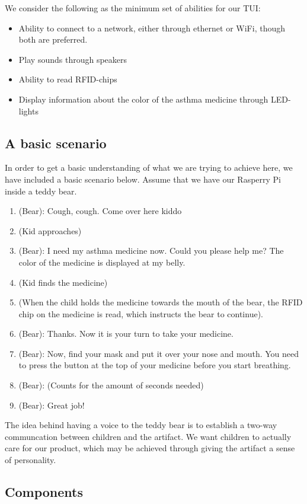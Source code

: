 We consider the following as the minimum set of abilities for our TUI:

\begin{itemize}
  \item Ability to connect to a network, either through ethernet or WiFi, though both are preferred. 
  \item Play sounds through speakers
  \item Ability to read RFID-chips
  \item Display information about the color of the asthma medicine through LED-lights
\end{itemize} 

\subsection{A basic scenario}
In order to get a basic understanding of what we are trying to achieve here, we have included a basic scenario below. Assume that we have our Rasperry Pi inside a teddy bear.  

\begin{enumerate}
  \item (Bear): Cough, cough. Come over here kiddo 
  \item (Kid approaches)
  \item (Bear): I need my asthma medicine now. Could you please help me? The color of the medicine is displayed at my belly.
  \item (Kid finds the medicine)
  \item (When the child holds the medicine towards the mouth of the bear, the RFID chip on the medicine is read, which instructs the bear to continue). 
  \item (Bear): Thanks. Now it is your turn to take your medicine. 
  \item (Bear): Now, find your mask and put it over your nose and mouth. You need to press the button at the top of your medicine before you start breathing. 
  \item (Bear): (Counts for the amount of seconds needed)
  \item (Bear): Great job!
\end{enumerate}

The idea behind having a voice to the teddy bear is to establish a two-way communcation between children and the artifact. We want children to actually care for our product, which may be achieved through giving the artifact a sense of personality. 


\subsection{Components}

